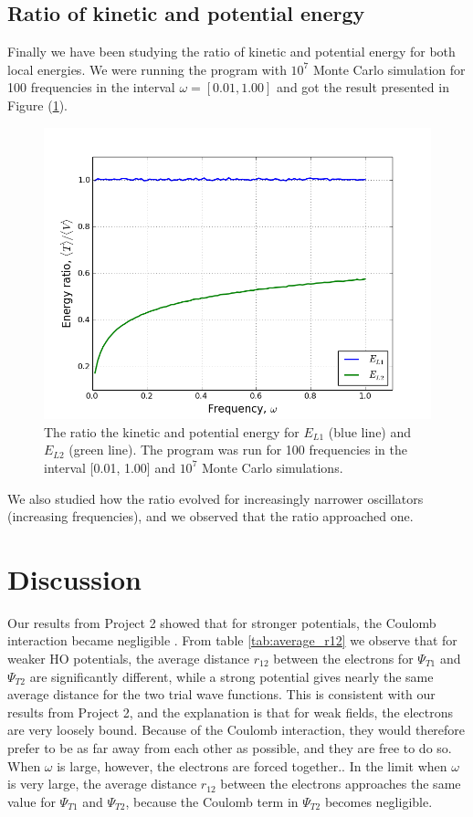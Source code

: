 \documentclass[norsk,a4paper,12pt]{article}
\begin{document}
\subsection{Ratio of kinetic and potential energy}
Finally we have been studying the ratio of kinetic and potential energy for both local energies. We were running the program with $10^7$ Monte Carlo simulation for 100 frequencies in the interval $\omega=[0.01,1.00]$ and got the result presented in Figure (\ref{fig:ratio}).

\begin{figure} [H]
    \centering
    \includegraphics[width=12cm]{energy_ratio_1e7.png}
    \caption{The ratio the kinetic and potential energy for $E_{L1}$ (blue line) and $E_{L2}$ (green line). The program was run for 100 frequencies in the interval [0.01, 1.00] and $10^7$ Monte Carlo simulations.}
    \label{fig:ratio}
\end{figure}
We also studied how the ratio evolved for increasingly narrower oscillators (increasing frequencies), and we observed that the ratio approached one. 




\section{Discussion} \label{Discussion}
Our results from Project 2 showed that for stronger potentials, the Coulomb interaction became negligible \cite{Project_2}. From table \ref{tab:average_r12} we observe that for weaker HO potentials, the average distance $r_{12}$ between the electrons for $\Psi_{T1}$ and $\Psi_{T2}$ are significantly different, while a strong potential gives nearly the same average distance for the two trial wave functions. This is consistent with our results from Project 2, and the explanation is that for weak fields, the electrons are very loosely bound. Because of the Coulomb interaction, they would therefore prefer to be as far away from each other as possible, and they are free to do so. When $\omega$ is large, however, the electrons are forced together.. In the limit when $\omega$ is very large, the average distance $r_{12}$ between the electrons approaches the same value for $\Psi_{T1}$ and $\Psi_{T2}$, because the Coulomb term in $\Psi_{T2}$ becomes negligible.\par 
\vspace{3mm}
\end{document}
